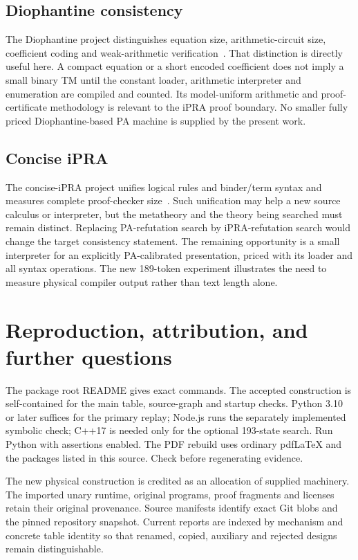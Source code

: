 \documentclass[11pt,letterpaper]{article}
\newcommand{\file}[1]{\path{#1}}
\begin{document}
\subsection{Diophantine consistency}

The Diophantine project distinguishes equation size, arithmetic-circuit size, coefficient coding and weak-arithmetic verification~\cite{dioph}. That distinction is directly useful here. A compact equation or a short encoded coefficient does not imply a small binary TM until the constant loader, arithmetic interpreter and enumeration are compiled and counted. Its model-uniform arithmetic and proof-certificate methodology is relevant to the iPRA proof boundary. No smaller fully priced Diophantine-based PA machine is supplied by the present work.

\subsection{Concise iPRA}

The concise-iPRA project unifies logical rules and binder/term syntax and measures complete proof-checker size~\cite{concise}. Such unification may help a new source calculus or interpreter, but the metatheory and the theory being searched must remain distinct. Replacing PA-refutation search by iPRA-refutation search would change the target consistency statement. The remaining opportunity is a small interpreter for an explicitly PA-calibrated presentation, priced with its loader and all syntax operations. The new 189-token experiment illustrates the need to measure physical compiler output rather than text length alone.

\section{Reproduction, attribution, and further questions}

The package root README gives exact commands. The accepted construction is self-contained for the main table, source-graph and startup checks. Python 3.10 or later suffices for the primary replay; Node.js runs the separately implemented symbolic check; C++17 is needed only for the optional 193-state search. Run Python with assertions enabled. The PDF rebuild uses ordinary pdfLaTeX and the packages listed in this source. Check \file{SHA256SUMS} before regenerating evidence.

The new physical construction is credited as an allocation of supplied machinery. The imported unary runtime, original programs, proof fragments and licenses retain their original provenance. Source manifests identify exact Git blobs and the pinned repository snapshot. Current reports are indexed by mechanism and concrete table identity so that renamed, copied, auxiliary and rejected designs remain distinguishable.
\end{document}
